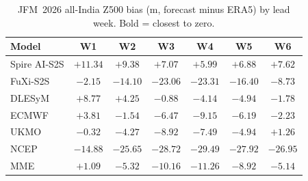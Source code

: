 \begin{table}[t]
  \centering
  \caption{JFM~2026 all-India Z500 bias (m, forecast minus ERA5) by lead week. Bold = closest to zero.}
  \label{tab:bias_z500}
  \small
  \begin{tabular}{lcccccc}
    \toprule
    Model & W1 & W2 & W3 & W4 & W5 & W6 \\
    \midrule
    Spire AI-S2S   & $+11.34$ & $+9.38$ & $+7.07$ & $+5.99$ & $+6.88$ & $+7.62$ \\
FuXi-S2S       & $-2.15$ & $-14.10$ & $-23.06$ & $-23.31$ & $-16.40$ & $-8.73$ \\
DLESyM         & $+8.77$ & $+4.25$ & $\mathbf{-0.88}$ & $\mathbf{-4.14}$ & $\mathbf{-4.94}$ & $-1.78$ \\
ECMWF          & $+3.81$ & $\mathbf{-1.54}$ & $-6.47$ & $-9.15$ & $-6.19$ & $-2.23$ \\
UKMO           & $\mathbf{-0.32}$ & $-4.27$ & $-8.92$ & $-7.49$ & $-4.94$ & $\mathbf{+1.26}$ \\
NCEP           & $-14.88$ & $-25.65$ & $-28.72$ & $-29.49$ & $-27.92$ & $-26.95$ \\
MME            & $+1.09$ & $-5.32$ & $-10.16$ & $-11.26$ & $-8.92$ & $-5.14$ \\
    \bottomrule
  \end{tabular}
\end{table}
